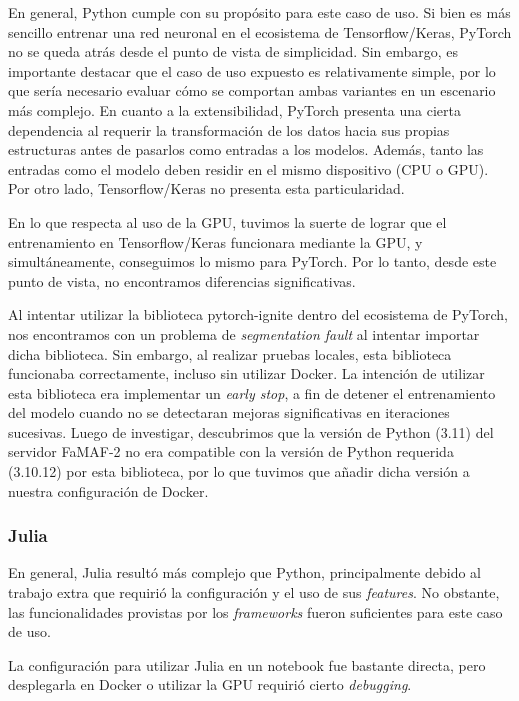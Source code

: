\documentclass[11pt]{article}
\let\Oldsubsubsection\subsubsection
\renewcommand{\subsubsection}{\FloatBarrier\Oldsubsubsection}
\newcommand{\english}[1]{\textit{#1}}
\begin{document}
En general, Python cumple con su propósito para este caso de uso. Si bien es más sencillo entrenar una red neuronal en el ecosistema de Tensorflow/Keras, PyTorch no se queda atrás desde el punto de vista de simplicidad. Sin embargo, es importante destacar que el caso de uso expuesto es relativamente simple, por lo que sería necesario evaluar cómo se comportan ambas variantes en un escenario más complejo. En cuanto a la extensibilidad, PyTorch presenta una cierta dependencia al requerir la transformación de los datos hacia sus propias estructuras antes de pasarlos como entradas a los modelos. Además, tanto las entradas como el modelo deben residir en el mismo dispositivo (CPU o GPU). Por otro lado, Tensorflow/Keras no presenta esta particularidad.

En lo que respecta al uso de la GPU, tuvimos la suerte de lograr que el entrenamiento en Tensorflow/Keras funcionara mediante la GPU, y simultáneamente, conseguimos lo mismo para PyTorch. Por lo tanto, desde este punto de vista, no encontramos diferencias significativas.

Al intentar utilizar la biblioteca pytorch-ignite dentro del ecosistema de PyTorch, nos encontramos con un problema de \english{segmentation fault} al intentar importar dicha biblioteca. Sin embargo, al realizar pruebas locales, esta biblioteca funcionaba correctamente, incluso sin utilizar Docker. La intención de utilizar esta biblioteca era implementar un \english{early stop}, a fin de detener el entrenamiento del modelo cuando no se detectaran mejoras significativas en iteraciones sucesivas. Luego de investigar, descubrimos que la versión de Python (3.11) del servidor FaMAF-2 no era compatible con la versión de Python requerida (3.10.12) por esta biblioteca, por lo que tuvimos que añadir dicha versión a nuestra configuración de Docker.

\subsubsection{Julia}

En general, Julia resultó más complejo que Python, principalmente debido al trabajo extra que requirió la configuración y el uso de sus \english{features}. No obstante, las funcionalidades provistas por los \english{frameworks} fueron suficientes para este caso de uso.

La configuración para utilizar Julia en un notebook fue bastante directa, pero desplegarla en Docker o utilizar la GPU requirió cierto \english{debugging}.
\end{document}
